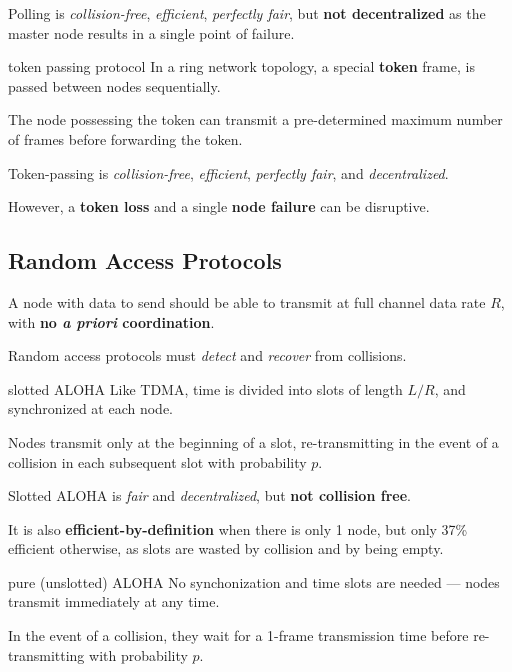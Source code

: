 Polling is \textit{collision-free}, \textit{efficient}, \textit{perfectly fair},
but \textbf{not decentralized} as the master node results in a single point of failure.

\begin{defn}{token passing protocol}
    In a ring network topology, a special \textbf{token} frame, is passed between
    nodes sequentially.

    The node possessing the token can transmit a pre-determined maximum number of frames
    before forwarding the token.
\end{defn}

Token-passing is \textit{collision-free}, \textit{efficient}, \textit{perfectly fair}, and \textit{decentralized}.

However, a \textbf{token loss} and a single \textbf{node failure} can be disruptive.

\subsection{Random Access Protocols}
A node with data to send should be able to transmit at full channel data rate $R$,
with \textbf{no \textit{a priori} coordination}.

Random access protocols must \textit{detect} and \textit{recover} from collisions.

\begin{defn}{slotted ALOHA}
    Like TDMA, time is divided into slots of length $L / R$, and synchronized at each node.

    Nodes transmit only at the beginning of a slot, re-transmitting in the event of a collision
    in each subsequent slot with probability $p$.
\end{defn}

Slotted ALOHA is \textit{fair} and \textit{decentralized}, but \textbf{not collision free}.

It is also \textbf{efficient-by-definition} when there is only 1 node, 
but only 37\% efficient otherwise, as slots are wasted by collision and by being empty.

\begin{defn}{pure (unslotted) ALOHA}
    No synchonization and time slots are needed --- nodes transmit immediately at any time.

    In the event of a collision, they wait for a 1-frame transmission time 
    before re-transmitting with probability $p$.
\end{defn}

